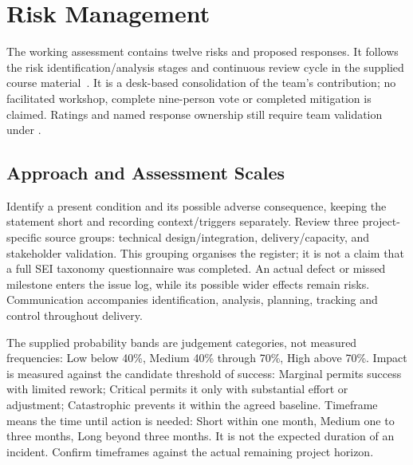 \section{Risk Management}\label{sec:risk-management}
The working assessment contains twelve risks and proposed responses. It follows
the risk identification/analysis stages and continuous review cycle in the supplied course material~\cite{course-risk}. It is a desk-based consolidation
of the team's contribution; no facilitated workshop, complete nine-person vote
or completed mitigation is claimed. Ratings and named response ownership still
require team validation under .

\subsection{Approach and Assessment Scales}
Identify a present condition and its possible adverse consequence, keeping the
statement short and recording context/triggers separately. Review three
project-specific source groups: technical design/integration, delivery/capacity,
and stakeholder validation. This grouping organises the register; it is not a
claim that a full SEI taxonomy questionnaire was completed. An actual defect or
missed milestone enters the issue log, while its possible wider effects remain
risks. Communication accompanies identification, analysis, planning, tracking and
control throughout delivery.

The supplied probability bands are judgement categories, not measured frequencies:
Low below 40\%, Medium 40\% through 70\%, High above 70\%. Impact is measured
against the candidate threshold of success: Marginal permits success with limited
rework; Critical permits it only with substantial effort or adjustment;
Catastrophic prevents it within the agreed baseline. Timeframe means the time
until action is needed: Short within one month, Medium one to three months,
Long beyond three months. It is not the expected duration of an incident.
Confirm timeframes against the actual remaining project horizon.


